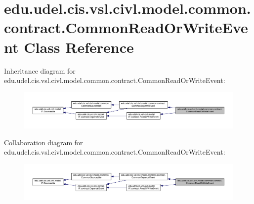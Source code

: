 \hypertarget{classedu_1_1udel_1_1cis_1_1vsl_1_1civl_1_1model_1_1common_1_1contract_1_1CommonReadOrWriteEvent}{}\section{edu.\+udel.\+cis.\+vsl.\+civl.\+model.\+common.\+contract.\+Common\+Read\+Or\+Write\+Event Class Reference}
\label{classedu_1_1udel_1_1cis_1_1vsl_1_1civl_1_1model_1_1common_1_1contract_1_1CommonReadOrWriteEvent}


Inheritance diagram for edu.\+udel.\+cis.\+vsl.\+civl.\+model.\+common.\+contract.\+Common\+Read\+Or\+Write\+Event\+:
\nopagebreak
\begin{figure}[H]
\begin{center}
\leavevmode
\includegraphics[width=350pt]{classedu_1_1udel_1_1cis_1_1vsl_1_1civl_1_1model_1_1common_1_1contract_1_1CommonReadOrWriteEvent__inherit__graph}
\end{center}
\end{figure}


Collaboration diagram for edu.\+udel.\+cis.\+vsl.\+civl.\+model.\+common.\+contract.\+Common\+Read\+Or\+Write\+Event\+:
\nopagebreak
\begin{figure}[H]
\begin{center}
\leavevmode
\includegraphics[width=350pt]{classedu_1_1udel_1_1cis_1_1vsl_1_1civl_1_1model_1_1common_1_1contract_1_1CommonReadOrWriteEvent__coll__graph}
\end{center}
\end{figure}

